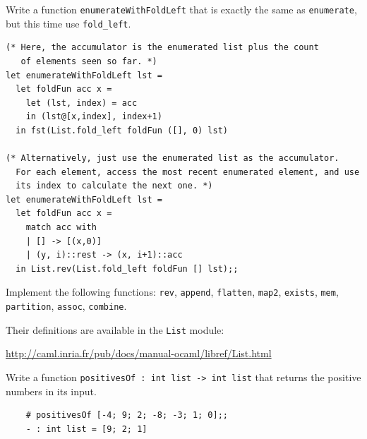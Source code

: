 \documentclass[addpoints]{exam}
\begin{document}
\begin{questions}
  
  \question 
  Write a function \texttt{enumerateWithFoldLeft}
  that is exactly the same as \texttt{enumerate},
  but this time use \texttt{fold\_left}.

  \begin{solutionbox}{8.5cm}
    \begin{verbatim}
(* Here, the accumulator is the enumerated list plus the count
   of elements seen so far. *)      
let enumerateWithFoldLeft lst =
  let foldFun acc x =
    let (lst, index) = acc
    in (lst@[x,index], index+1)
  in fst(List.fold_left foldFun ([], 0) lst)

(* Alternatively, just use the enumerated list as the accumulator.
  For each element, access the most recent enumerated element, and use
  its index to calculate the next one. *)
let enumerateWithFoldLeft lst =
  let foldFun acc x =
    match acc with
    | [] -> [(x,0)]
    | (y, i)::rest -> (x, i+1)::acc
  in List.rev(List.fold_left foldFun [] lst);;
    \end{verbatim}
  \end{solutionbox}

  
  \vspace{2em}
  \vspace{1em}

  \question 
  Implement the following functions:
  \texttt{rev}, \texttt{append}, \texttt{flatten},
  \texttt{map2}, \texttt{exists}, \texttt{mem},
  \texttt{partition}, \texttt{assoc}, \texttt{combine}.

  
  Their definitions are available in the \texttt{List} module:

  \url{http://caml.inria.fr/pub/docs/manual-ocaml/libref/List.html}


  \vspace{2em}
  \vspace{1em}

  \question
  Write a function \texttt{positivesOf : int list -> int list}
  that returns the positive numbers in its input.
  \begin{verbatim}
    # positivesOf [-4; 9; 2; -8; -3; 1; 0];;
    - : int list = [9; 2; 1]
  \end{verbatim}


\end{questions}
\end{document}
